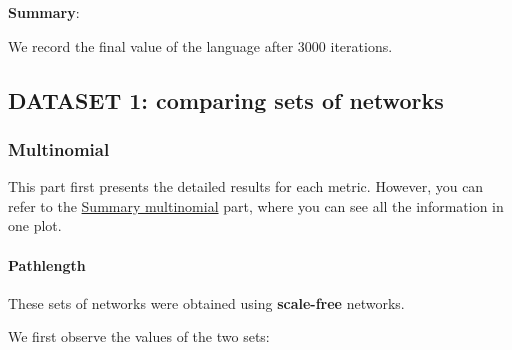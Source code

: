 \documentclass[
]{article}
\begin{document}
\textbf{Summary}:

We record the final value of the language after 3000 iterations.

\hypertarget{dataset-1-comparing-sets-of-networks}{%
\subsection{DATASET 1: comparing sets of
networks}\label{dataset-1-comparing-sets-of-networks}}

\hypertarget{multinomial-1}{%
\subsubsection{Multinomial}\label{multinomial-1}}

This part first presents the detailed results for each metric. However,
you can refer to the \protect\hyperlink{summary-multinomial}{Summary
multinomial} part, where you can see all the information in one plot.

\hypertarget{pathlength}{%
\paragraph{Pathlength}\label{pathlength}}

These sets of networks were obtained using \textbf{scale-free} networks.

We first observe the values of the two sets:
\end{document}
